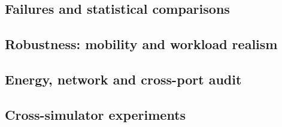 \documentclass[journal,10pt]{IEEEtran}
\begin{document}
\subsection{Failures and statistical comparisons}




\subsection{Robustness: mobility and workload realism}




\subsection{Energy, network and cross-port audit}



\subsection{Cross-simulator experiments}


\end{document}
